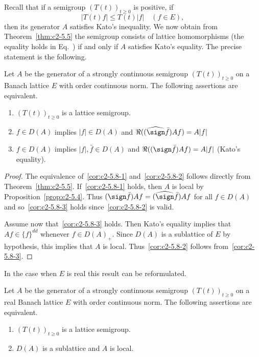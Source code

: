 Recall that if a semigroup $(T(t))_{t \geq 0}$ is positive, \ie if
\begin{equation}\label{eq:c2-5.13}
|T(t)f| \leq T(t) |f| \quad (f \in E) ,
\end{equation}
then its generator $A$ satisfies Kato's inequality. 
We now obtain from Theorem~\ref{thm:c2-5.5} the semigroup consists of lattice homomorphisms (\ie the equality holds in Eq.~) if and only if\/ $A$ satisfies Kato's equality. 
The precise statement is the following.

\begin{corollary}\label{cor:c2-5.8}
Let $A$ be the generator of a strongly continuous semigroup $(T(t))_{t \geq 0}$ on a Banach lattice $E$ with order continuous norm. 
The following assertions are equivalent.
\begin{enumerate}[\upshape (a)]
\item \label{cor:c2-5.8-1}
$(T(t))_{t \geq 0}$ is a lattice semigroup.
\item \label{cor:c2-5.8-2}
$f \in D(A)$ implies $|f| \in D(A)$ and $\Re((\widehat{\sign}  \bar{f})Af) = A|f|$ 
\item \label{cor:c2-5.8-3}
$f \in D(A)$ implies $|f|,\bar{f} \in D(A)$ and $\Re((\sign  \bar{f})Af) = A|f|$ 
(Kato's equality).
\end{enumerate}
\end{corollary}

\begin{proof}
The equivalence of~\ref{cor:c2-5.8-1}   and~\ref{cor:c2-5.8-2}   follows directly from Theorem~\ref{thm:c2-5.5}. 
If~\ref{cor:c2-5.8-1}   holds, then $A$ is local by  Proposition~\ref{prop:c2-5.4}.
Thus $(\sign  \bar{f})Af = (\widehat{\sign}  \bar{f})Af$ for all $f \in D(A)$ and so~\ref{cor:c2-5.8-3}   holds since~\ref{cor:c2-5.8-2}   is valid.

Assume now that~\ref{cor:c2-5.8-3}   holds. 
Then Kato's equality implies that $Af \in \{f\}^{dd}$ whenever $f \in D(A)_{+}$. 
Since $D(A)$ is a sublattice of\/ $E$ by hypothesis, this implies that $A$ is local. 
Thus~\ref{cor:c2-5.8-2}   follows from~\ref{cor:c2-5.8-3}.
\end{proof}

In the case when $E$ is real this result can be reformulated.

\begin{corollary}\label{cor:c2-5.9}
%
Let $A$ be the generator of a strongly continuous semigroup $(T(t))_{t \geq 0}$ on a real Banach lattice $E$ with order continuous norm. 
The following assertions are equivalent.
\begin{enumerate}[\upshape (a)]
\item \label{cor:c2-5.9-1}
$(T(t))_{t \geq 0}$ is a lattice semigroup.
\item \label{cor:c2-5.9-2}
$D(A)$ is a sublattice and $A$ is local.
\end{enumerate}
\end{corollary}

